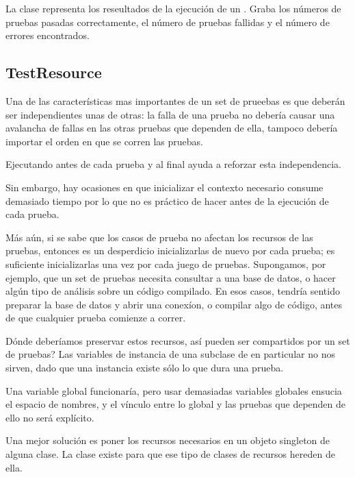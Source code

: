 \documentclass[a4paper,10pt,twoside]{book}
\begin{document}
La clase  representa los reseultados de la ejecuci\'on de un .
Graba los n\'umeros de pruebas pasadas correctamente, el n\'umero de pruebas fallidas y el n\'umero
de errores encontrados.

\subsection{TestResource}

Una de las caracter\'isticas mas importantes de un set de prueebas es que 
deber\'an ser independientes unas de otras: la falla de una prueba no deber\'ia causar una avalancha
de fallas en las otras pruebas que dependen de ella, tampoco deber\'ia importar el orden en que se corren las
pruebas.  

Ejecutando  antes de cada prueba y  al final ayuda a reforzar esta independencia.
 
Sin embargo, hay ocasiones en que inicializar el contexto necesario consume demasiado tiempo por lo que no es 
pr\'actico de hacer antes de la ejecuci\'on de cada prueba.

M\'as a\'un, si se sabe que los casos de prueba no afectan los recursos de las pruebas, entonces es un
desperdicio inicializarlas de nuevo por cada prueba; es suficiente inicializarlas una vez por cada juego
de pruebas.
Supongamos, por ejemplo, que un set de pruebas necesita consultar a una base de datos, o hacer
alg\'un tipo de an\'alisis sobre un c\'odigo compilado.
En esos casos, tendr\'ia sentido preparar la base de datos y abrir una conex\'ion, o compilar algo
de c\'odigo, antes de que cualquier prueba comienze a correr.


D\'onde deber\'iamos preservar estos recursos, as\'i pueden ser compartidos por un set de pruebas?
Las variables de instancia de una subclase de  en particular no nos sirven, dado que una instancia
existe s\'olo lo que dura una prueba.

Una variable global funcionar\'ia, pero usar demasiadas variables globales ensucia el espacio de nombres,
y el v\'inculo entre lo global y las pruebas que dependen de ello no ser\'a expl\'icito. 

Una mejor soluci\'on es poner los recursos necesarios en un objeto singleton de alguna clase.
La clase  existe para que ese tipo de clases de recursos hereden de ella.
\end{document}
